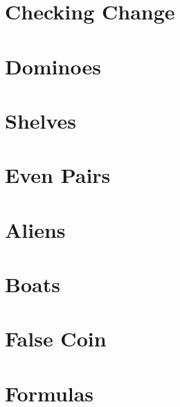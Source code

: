 \documentclass[a4paper, 10pt]{article}
\let\stdsection\section
\renewcommand\section{\newpage\stdsection}
\newcommand{\includecode}[1]{
    }
\begin{document}
    \begin{multicols}{2}
        \renewcommand{\cftsecleader}{\cftdotfill{\cftdotsep}}
        \renewcommand*\contentsname{Problems}
        \setcounter{tocdepth}{1}    %
        \tableofcontents
    \end{multicols}
    
    
    \section{Checking Change}
        \includecode{../problems/w01/Checking_Change/CheckingChange1.cpp}
    
    \section{Dominoes}
        \includecode{../problems/w01/Dominoes/Dominoes1.cpp}
    
    \section{Shelves}
        \includecode{../problems/w01/Shelves/Shelves1.cpp}
        
    \section{Even Pairs}
        \includecode{../problems/w01/Even_Pairs/EvenPairs1.cpp}
    
    
    \section{Aliens}
        \includecode{../problems/w02/Aliens/Aliens1.cpp}
        
    \section{Boats}
        \includecode{../problems/w02/Boats/Boats1.cpp}
        
    \section{False Coin}
        \includecode{../problems/w02/False_Coin/FalseCoin1.cpp}
        
    \section{Formulas}
        \includecode{../problems/w02/Formulas/Formulas1.cpp}
        
\end{document}
